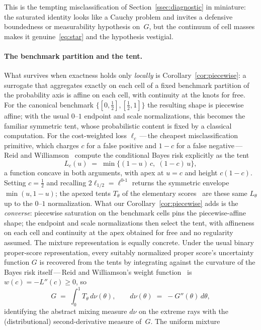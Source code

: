 \documentclass{article}
\theoremstyle{plain}
\theoremstyle{definition}
\begin{document}
This is the tempting misclassification of
Section~\ref{ssec:diagnostic} in miniature: the saturated identity
looks like a Cauchy problem and invites a defensive boundedness or
measurability hypothesis on~$G$, but the continuum of cell masses
makes it genuine~\eqref{eq:star} and the hypothesis vestigial.

\paragraph{The benchmark partition and the tent.}
What survives when exactness holds only \emph{locally} is
Corollary~\ref{cor:piecewise}: a surrogate that aggregates exactly on
each cell of a fixed benchmark partition of the probability axis is
affine on each cell, with continuity at the knots for free. For the
canonical benchmark $\{[0,\tfrac12],[\tfrac12,1]\}$ the resulting
shape is piecewise affine; with the usual $0$--$1$ endpoint and scale normalizations, this becomes the familiar symmetric tent, whose
probabilistic content is fixed by a classical computation. For the
cost-weighted loss $\ell_c$\,---\,the cheapest misclassification primitive,
which charges $c$ for a false positive and $1-c$ for a false
negative\,---\,Reid and Williamson~\cite[Thm~14]{ReidWilliamson2011} compute
the conditional Bayes risk explicitly as the tent
\[
L_c(u)\;=\;\min\bigl\{(1-u)\,c,\;(1-c)\,u\bigr\},
\]
a function concave in both arguments, with apex at $u=c$ and height $c(1-c)$.
Setting $c=\tfrac12$ and recalling $2\ell_{1/2}=\ell^{0\text{-}1}$ returns the
symmetric envelope $\min(u,1-u)$; the apexed tents $T_\theta$ of the elementary
scores~\cite{Schervish1989,EGJK2016} are these same $L_\theta$ up to the
$0$--$1$ normalization. What our Corollary~\ref{cor:piecewise} adds is the
\emph{converse}: piecewise saturation on the benchmark cells pins the piecewise-affine shape; the endpoint and scale normalizations then select the tent, with affineness on each cell and continuity at the apex obtained
for free and no regularity assumed. The mixture representation is equally
concrete. Under the usual binary proper-score representation, every suitably normalized proper score's uncertainty function $G$ is recovered from the
tents by integrating against the curvature of the Bayes risk
itself\,---\,Reid and Williamson's weight
function~\cite[Thm~16]{ReidWilliamson2011} is $w(c)=-L''(c)\ge0$, so
\[
G\;=\;\int_0^1 T_\theta\,d\nu(\theta),
\qquad d\nu(\theta)\;=\;-G''(\theta)\,d\theta,
\]
identifying the abstract mixing measure $d\nu$ on the extreme rays with the
(distributional) second-derivative measure of~$G$. The uniform mixture
\end{document}
